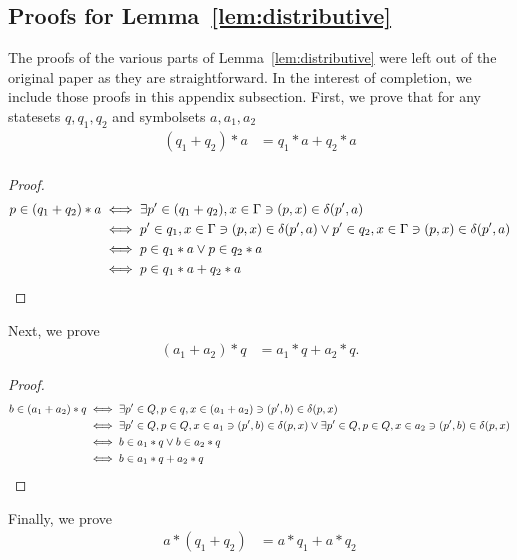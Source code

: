 \subsection{Proofs for Lemma~\ref{lem:distributive}}\label{ssec:distributive_proofs}

The proofs of the various parts of Lemma~\ref{lem:distributive} were left out of the original
paper as they are straightforward.
In the interest of completion, we include those proofs in this appendix subsection.
First, we prove that for any statesets $q, q_1, q_2$ and symbolsets $a, a_1, a_2$
\begin{align*}
    (q_1 + q_2) * a &= q_1 * a + q_2 * a \\
\end{align*}

\begin{proof}
    \begin{align*}
        p \in (q_1 + q_2) * a & \iff \exists p' \in (q_1+q_2), x \in \Gamma \ni (p,x) \in \delta(p', a) \\
        & \iff p' \in q_1, x \in \Gamma \ni (p,x) \in \delta(p', a) \lor
               p' \in q_2, x \in \Gamma \ni (p,x) \in \delta(p', a) \\
        & \iff p \in q_1 * a \lor p \in q_2 * a \\
        & \iff p \in q_1 * a + q_2 * a
    \end{align*}
\end{proof}

Next, we prove
\begin{align*}
    (a_1 + a_2) * q &= a_1 * q + a_2 * q.
\end{align*}

\begin{proof}
    \begin{align*}
        b \in (a_1 + a_2) * q & \iff \exists p' \in Q, p \in q, x \in (a_1 + a_2) \ni (p',b) \in \delta(p,x) \\
        & \iff \exists p' \in Q, p \in Q, x \in a_1 \ni (p', b) \in \delta(p,x) \lor
         \exists p' \in Q, p \in Q, x \in a_2 \ni (p', b) \in \delta(p,x) \\
        & \iff b \in a_1 * q \lor b \in a_2 * q \\
        & \iff b \in a_1 * q + a_2 * q
    \end{align*}
\end{proof}

Finally, we prove
\begin{align*}
    a * (q_1 + q_2) &= a*q_1 + a*q_2
\end{align*}

